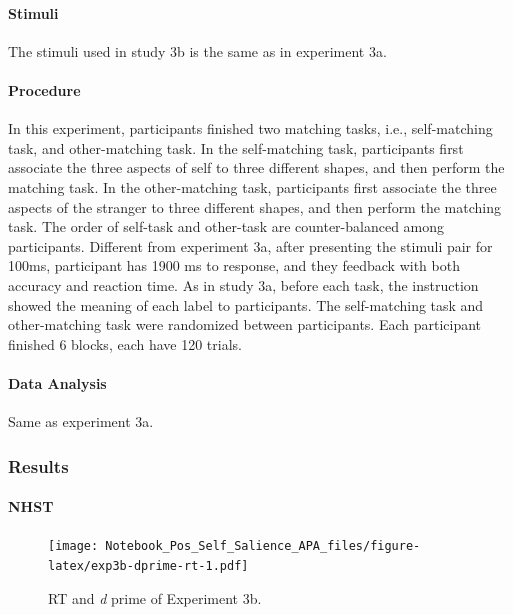 \documentclass[
  english,
  man]{apa6}
\let\oldparagraph\paragraph
\renewcommand{\paragraph}[1]{\oldparagraph{#1}\mbox{}}
\begin{document}
\hypertarget{stimuli-2}{%
\paragraph{Stimuli}\label{stimuli-2}}

The stimuli used in study 3b is the same as in experiment 3a.

\hypertarget{procedure-6}{%
\paragraph{Procedure}\label{procedure-6}}

In this experiment, participants finished two matching tasks, i.e., self-matching task, and other-matching task. In the self-matching task, participants first associate the three aspects of self to three different shapes, and then perform the matching task. In the other-matching task, participants first associate the three aspects of the stranger to three different shapes, and then perform the matching task. The order of self-task and other-task are counter-balanced among participants.
Different from experiment 3a, after presenting the stimuli pair for 100ms, participant has 1900 ms to response, and they feedback with both accuracy and reaction time.
As in study 3a, before each task, the instruction showed the meaning of each label to participants. The self-matching task and other-matching task were randomized between participants. Each participant finished 6 blocks, each have 120 trials.

\hypertarget{data-analysis-7}{%
\paragraph{Data Analysis}\label{data-analysis-7}}

Same as experiment 3a.

\hypertarget{results-6}{%
\subsubsection{Results}\label{results-6}}

\hypertarget{nhst-4}{%
\paragraph{NHST}\label{nhst-4}}

\begin{figure}
\centering
\texttt{[image: Notebook\_Pos\_Self\_Salience\_APA\_files/figure-latex/exp3b-dprime-rt-1.pdf]}
\caption{\label{fig:exp3b-dprime-rt}RT and \emph{d} prime of Experiment 3b.}
\end{figure}
\end{document}
